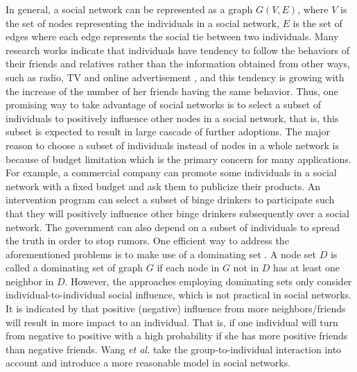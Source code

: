 In general, a social network can be represented as a graph $G(V, E)$, where $V$ is the set of nodes representing the individuals in a social network,
$E$ is the set of edges where each edge represents the social tie between two individuals.
Many research works indicate that individuals have tendency to follow the behaviors of their friends and relatives rather than the information obtained from other ways,
such as radio, TV and online advertisement \cite{JBD2005}, and this tendency is growing with the increase of the number of her friends having the same behavior.
Thus, one promising way to take advantage of social networks is to select a subset of individuals to positively influence other nodes in a social network, that is,
this subset is expected to result in large cascade of further adoptions.
The major reason to choose a subset of individuals instead of nodes in a whole network is because of budget limitation which is the primary concern for many applications.
For example, a commercial company can promote some individuals in a social network with a fixed budget and ask them to publicize their products.
An intervention program can select a subset of binge drinkers to participate such that they will positively influence other binge drinkers subsequently
over a social network.
The government can also depend on a subset of individuals to spread the truth in order to stop rumors.
One efficient way to address the aforementioned problems is to make use of a dominating set \cite{KLA2013}.
A node set $D$ is called a dominating set of graph $G$ if each node in $G$ not in $D$ has at least one neighbor in $D$.
However, the approaches employing dominating sets only consider individual-to-individual social influence, which is not practical in social networks.
It is indicated by \cite{JBD2005} that positive (negative) influence from more neighbors/friends will result in more impact to an individual.
That is, if one individual will turn from negative to positive with a high probability if she has more positive friends than negative friends.
Wang {\it et al.} \cite{WDC2011} take the group-to-individual interaction into account and introduce a more reasonable model in social networks.
